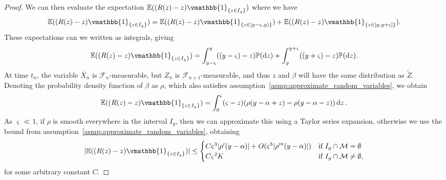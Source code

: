 \documentclass[manuscript,review]{acmart}
\newcommand{\indicatorfn}{\vmathbb{1}}
\begin{document}
\begin{proof}
We can then evaluate the expectation $ \mathbb{E}((R(z) - z)\indicatorfn_{\{z \in I_y\}}) $ where we have 
\begin{equation*}
\mathbb{E}((R(z) - z)\indicatorfn_{\{z \in I_y\}}) 
= \mathbb{E}((R(z) - z)\indicatorfn_{\{z \in [y-\varsigma, y)\}}) 
+ \mathbb{E}((R(z) - z)\indicatorfn_{\{z \in [y, y+\varsigma]\}}).
\end{equation*}
These expectations can we written as integrals, giving
\begin{equation*}
\mathbb{E}((R(z) - z)\indicatorfn_{\{z \in I_y\}}) 
= \int_{y-\varsigma}^{y} ((y-\varsigma) - z) \mathbb{P}(\dd{z}) 
+ \int_{y}^{y+\varsigma} ((y+\varsigma) - z) \mathbb{P}(\dd{z}).
\end{equation*}
At time $ t_n $, the variable $ \overline{X}_n $ is $ \mathcal{F}_n $-measurable, but $ Z_n $ is $ \mathcal{F}_{n+1} $-measurable, and thus $ z $ and $ \beta $ will have the same distribution as $ \widetilde{Z} $. Denoting the probability density function of $ \beta $ as $ \rho $, which also satisfies assumption~\ref{asmp:approximate_random_variables}, we obtain
\begin{equation*}
\mathbb{E}((R(z) - z)\indicatorfn_{\{z \in I_y\}}) 
= \int_0^{\varsigma} (\varsigma - z) (\rho(y- \alpha + z) - \rho(y- \alpha -z)) \dd{z}.
\end{equation*}
As $ \varsigma \ll 1 $, if $ \rho $ is smooth everywhere in the interval $ I_y $, then we can approximate this using a Taylor series expansion, otherwise we use the bound from assumption~\ref{asmp:approximate_random_variables}, obtaining
\begin{equation*}
\lvert \mathbb{E}((R(z) - z)\indicatorfn_{\{z \in I_y\}}) \rvert 
\leq  \begin{cases}
C \varsigma^3 \lvert \rho'(y - \alpha)\rvert  + O(\varsigma^5 \lvert \rho'''(y-\alpha)\rvert )& \text{if } I_y \cap \mathcal{M} = \emptyset \\
C \varsigma^2 K & \text{if } I_y \cap \mathcal{M} \neq \emptyset,
\end{cases}
\end{equation*}
for some arbitrary constant $ C $.


\end{proof}
\end{document}
